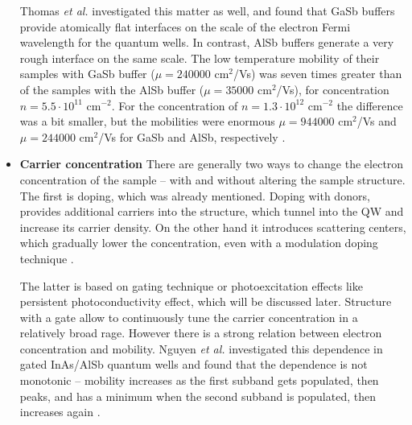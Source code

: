 \documentclass[titlepage,a4paper]{book}
\newcommand{\wciecie}{\quad\phantom{v}}
\begin{document}
\begin{itemize}
Thomas \textit{et al.} \cite{Thomas_Buffer} investigated this matter as well, and found that GaSb buffers provide atomically flat interfaces on the scale of the electron Fermi wavelength for the quantum wells. In contrast, AlSb buffers generate a very rough interface on the same scale. The low temperature mobility of their samples with GaSb buffer ($\mu = 240000$ cm$^2$/Vs) was seven times greater than of the samples with the AlSb buffer ($\mu = 35000$ cm$^2$/Vs), for concentration $n = 5.5 \cdot 10^{11}$ cm$^{-2}$. For the concentration of $n = 1.3 \cdot 10^{12}$ cm$^{-2}$ the difference was a bit smaller, but the mobilities were enormous $\mu = 944000$ cm$^2$/Vs and $\mu = 244000$ cm$^2$/Vs for GaSb and AlSb, respectively \cite{Nguyen_Mobility}\cite{Thomas_Buffer}\cite{Nguyen_Buffer}.

\item \textbf{Carrier concentration} \newline
\wciecie
There are generally two ways to change the electron concentration of the sample -- with and without altering the sample structure. The first is doping, which was already mentioned. Doping with donors, provides additional carriers into the structure, which tunnel into the QW and increase its carrier density. On the other hand it introduces scattering centers, which gradually lower the concentration, even with a modulation doping technique \cite{Nguyen_Buffer}. 

The latter is based on gating technique or photoexcitation effects like persistent photoconductivity effect, which will be discussed later. Structure with a gate allow to continuously tune the carrier concentration in a relatively broad rage. However there is a strong relation between electron concentration and mobility. Nguyen \textit{et al.} investigated this dependence in gated InAs/AlSb quantum wells and found that the dependence is not monotonic -- mobility increases as the first subband gets populated, then peaks, and has a minimum when the second subband is populated, then increases again \cite{Nguyen_Mobility}.
\end{itemize}
\end{document}
